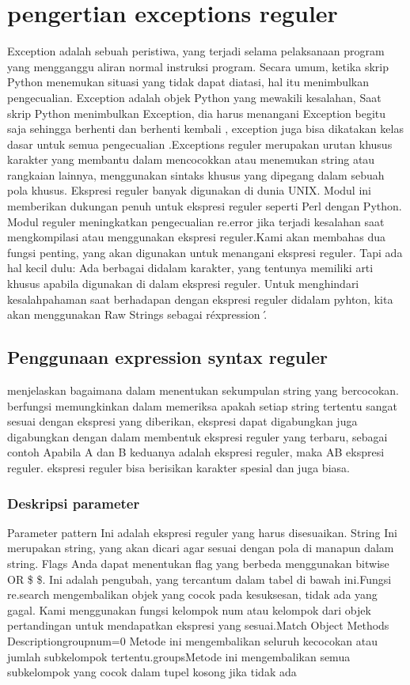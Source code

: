 \section{pengertian exceptions reguler}
Exception adalah sebuah peristiwa, yang terjadi selama pelaksanaan program yang mengganggu aliran normal instruksi program. Secara umum, ketika skrip Python menemukan situasi yang tidak dapat diatasi, hal itu menimbulkan pengecualian. Exception adalah objek Python yang mewakili kesalahan, Saat  skrip Python menimbulkan Exception, dia harus menangani Exception begitu saja sehingga berhenti dan berhenti kembali , exception juga bisa dikatakan kelas dasar untuk semua pengecualian .Exceptions reguler merupakan urutan khusus karakter yang membantu dalam mencocokkan atau menemukan string atau rangkaian lainnya, menggunakan sintaks khusus yang dipegang dalam sebuah pola khusus. Ekspresi reguler banyak digunakan di dunia UNIX. Modul ini memberikan dukungan penuh untuk ekspresi reguler seperti Perl dengan Python. Modul reguler meningkatkan pengecualian re.error jika terjadi kesalahan saat mengkompilasi atau menggunakan ekspresi reguler.Kami akan membahas dua fungsi penting, yang akan digunakan untuk menangani ekspresi reguler. Tapi ada hal kecil dulu: Ada berbagai didalam karakter, yang tentunya memiliki arti khusus apabila digunakan di dalam ekspresi reguler. Untuk menghindari kesalahpahaman  saat berhadapan dengan ekspresi reguler didalam pyhton, kita akan menggunakan Raw Strings sebagai r\'expression \'.

\subsection{Penggunaan expression syntax reguler}
menjelaskan bagaimana dalam menentukan sekumpulan string yang bercocokan. berfungsi memungkinkan dalam memeriksa apakah setiap string
tertentu sangat sesuai dengan ekspresi yang diberikan, ekspresi dapat digabungkan juga digabungkan dengan dalam membentuk ekspresi reguler yang terbaru, sebagai contoh Apabila A dan B  keduanya adalah ekspresi reguler, maka AB ekspresi reguler. ekspresi reguler 
bisa berisikan karakter spesial dan juga biasa.

\subsubsection{Deskripsi parameter}
 Parameter pattern Ini adalah ekspresi reguler yang harus disesuaikan. String Ini merupakan string, yang akan dicari agar sesuai dengan pola di manapun dalam string. Flags Anda dapat menentukan flag yang berbeda menggunakan bitwise OR {\$  \vert  \$}. Ini adalah pengubah, yang tercantum dalam tabel di bawah ini.Fungsi re.search mengembalikan objek yang cocok pada kesuksesan, tidak ada yang gagal. Kami menggunakan fungsi kelompok {num} atau kelompok {} dari objek pertandingan untuk mendapatkan ekspresi yang sesuai.Match Object Methods Descriptiongroup{num=0} Metode ini mengembalikan seluruh kecocokan atau jumlah subkelompok tertentu.groups{}Metode ini mengembalikan semua subkelompok yang cocok dalam tupel {kosong jika tidak ada} 

